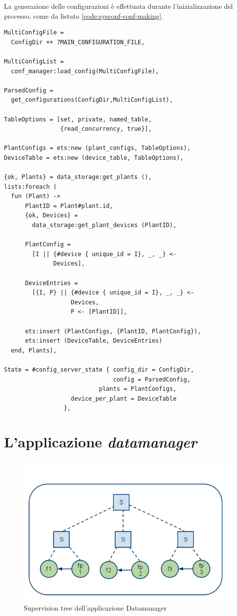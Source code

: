 %
La generazione delle configurazioni \`e effettuata durante l'inizializzazione del processo, 
come da listato \ref{code:sysconf-conf-making}.
%
\begin{lstlisting}[caption={Costruzione delle tabelle \texttt{plant} e \texttt{device\_per\_plant}}, label={code:sysconf-conf-making},frame=trBL]
MultiConfigFile = 
  ConfigDir ++ ?MAIN_CONFIGURATION_FILE,

MultiConfigList = 
  conf_manager:load_config(MultiConfigFile),

ParsedConfig = 
  get_configurations(ConfigDir,MultiConfigList),

TableOptions = [set, private, named_table, 
                {read_concurrency, true}],

PlantConfigs = ets:new (plant_configs, TableOptions),
DeviceTable = ets:new (device_table, TableOptions),
    
{ok, Plants} = data_storage:get_plants (),
lists:foreach (
  fun (Plant) ->
      PlantID = Plant#plant.id,
      {ok, Devices} = 
        data_storage:get_plant_devices (PlantID),

      PlantConfig = 
        [I || {#device { unique_id = I}, _, _} <- 
              Devices],

      DeviceEntries = 
        [{I, P} || {#device { unique_id = I}, _, _} <-
                   Devices,
                   P <- [PlantID]],
	      
      ets:insert (PlantConfigs, {PlantID, PlantConfig}),
      ets:insert (DeviceTable, DeviceEntries)
  end, Plants),

State = #config_server_state { config_dir = ConfigDir,
                               config = ParsedConfig,
     		               plants = PlantConfigs,
			       device_per_plant = DeviceTable
			     },
\end{lstlisting}
%

%
\section{L'applicazione \emph{datamanager}}
%
\begin{figure}[!h]
\centering
\includegraphics[width=380pt]{img/datamanager.png}
\caption{Supervision tree dell'applicazione Datamanager}
\end{figure}
%

